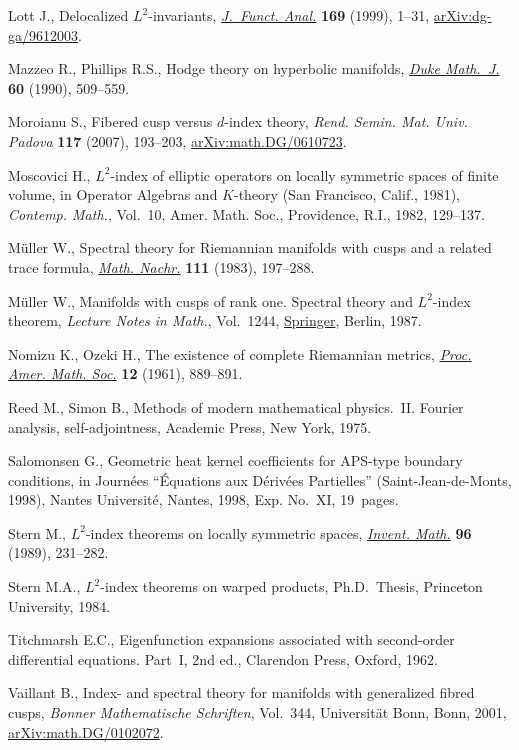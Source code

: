 \documentclass[pdftex]{sigma}%
\numberwithin{equation}{section}
\begin{document}
\begin{thebibliography}{99}
Lott J., Delocalized {$L^2$}-invariants, \href{https://doi.org/10.1006/jfan.1999.3451}{\textit{J.~Funct. Anal.}} \textbf{169}
 (1999), 1--31, \href{https://arxiv.org/abs/dg-ga/9612003}{arXiv:dg-ga/9612003}.

Mazzeo R., Phillips R.S., Hodge theory on hyperbolic manifolds, \href{https://doi.org/10.1215/S0012-7094-90-06021-1}{\textit{Duke
 Math.~J.}} \textbf{60} (1990), 509--559.

Moroianu S., Fibered cusp versus {$d$}-index theory, \textit{Rend. Semin. Mat.
 Univ. Padova} \textbf{117} (2007), 193--203, \href{https://arxiv.org/abs/math.DG/0610723}{arXiv:math.DG/0610723}.

Moscovici H., {$L^{2}$}-index of elliptic operators on locally symmetric spaces
 of finite volume, in Operator Algebras and {$K$}-theory ({S}an {F}rancisco,
 {C}alif., 1981), \textit{Contemp. Math.}, Vol.~10, Amer. Math. Soc.,
 Providence, R.I., 1982, 129--137.

M\"uller W., Spectral theory for {R}iemannian manifolds with cusps and a
 related trace formula, \href{https://doi.org/10.1002/mana.19831110109}{\textit{Math. Nachr.}} \textbf{111} (1983), 197--288.

M\"uller W., Manifolds with cusps of rank one. {S}pectral theory and
 {$L^2$}-index theorem, \textit{Lecture Notes in Math.}, Vol.~1244,
 \href{https://doi.org/10.1007/BFb0077660}{Springer}, Berlin, 1987.

Nomizu K., Ozeki H., The existence of complete {R}iemannian metrics,
 \href{https://doi.org/10.2307/2034383}{\textit{Proc. Amer. Math. Soc.}} \textbf{12} (1961), 889--891.

Reed M., Simon B., Methods of modern mathematical physics.~{II}. {F}ourier
 analysis, self-adjointness, Academic Press, New York, 1975.

Salomonsen G., Geometric heat kernel coefficients for {APS}-type boundary
 conditions, in Journ\'ees ``\'Equations aux {D}\'eriv\'ees {P}artielles''
 ({S}aint-{J}ean-de-{M}onts, 1998), Nantes Universit\'e, Nantes, 1998, Exp.
 No.~XI, 19~pages.

Stern M., {$L^2$}-index theorems on locally symmetric spaces, \href{https://doi.org/10.1007/BF01393964}{\textit{Invent.
 Math.}} \textbf{96} (1989), 231--282.

Stern M.A., {$L^2$}-index theorems on warped products, Ph.D.~Thesis,
 {P}rinceton University, 1984.

Titchmarsh E.C., Eigenfunction expansions associated with second-order
 differential equations. {P}art~{I}, 2nd ed., Clarendon Press, Oxford, 1962.

Vaillant B., Index- and spectral theory for manifolds with generalized fibred
 cusps, \textit{Bonner Mathematische Schriften}, Vol.~344, Universit\"at Bonn,
 Bonn, 2001, \href{https://arxiv.org/abs/math.DG/0102072}{arXiv:math.DG/0102072}.

\end{thebibliography}\LastPageEnding
\end{document}
